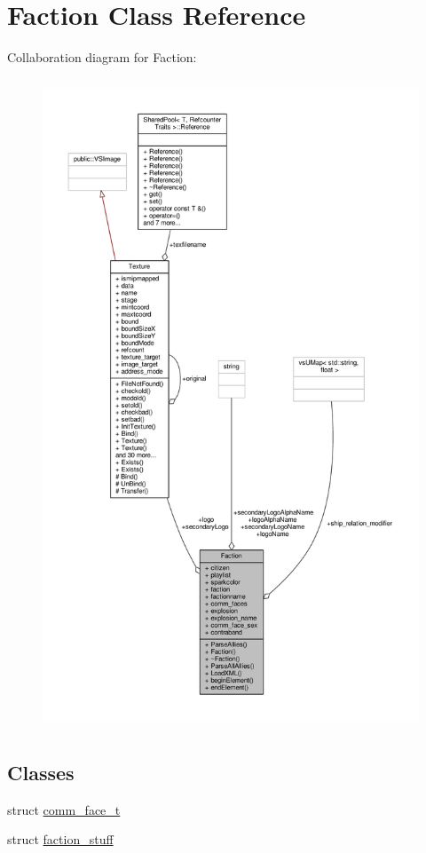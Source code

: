 \hypertarget{classFaction}{}\section{Faction Class Reference}
\label{classFaction}


Collaboration diagram for Faction\+:
\nopagebreak
\begin{figure}[H]
\begin{center}
\leavevmode
\includegraphics[height=550pt]{d9/dc3/classFaction__coll__graph}
\end{center}
\end{figure}
\subsection*{Classes}
\begin{DoxyCompactItemize}
\item 
struct \hyperlink{structFaction_1_1comm__face__t}{comm\+\_\+face\+\_\+t}
\item 
struct \hyperlink{structFaction_1_1faction__stuff}{faction\+\_\+stuff}
\end{DoxyCompactItemize}
